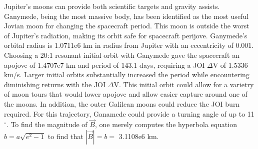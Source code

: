 \documentclass[]{aiaa-tc}%
\begin{document}
	\vspace{5 mm}

Jupiter's moons can provide both scientific targets and gravity assists. Ganymede, being the most massive body, has been identified as the most useful Jovian moon for changing the spacecraft period\cite{Damario}. This moon is outside the worst of Jupiter's radiation, making its orbit safe for spacecraft perijove. Ganymede's orbital radius is 1.0711e6 km in radius from Jupiter with an eccentricity of 0.001\cite{Damario}. Choosing a 20:1 resonant initial orbit with Ganymede gave the spacecraft an apojove of 1.4707e7 km and period of 143.1 days, requiring a JOI $\Delta$V of 1.5336 km/s. Larger initial orbits substantially increased the period while encountering diminishing returns with the JOI $\Delta$V. This initial orbit could allow for a varietry of moon tours that would lower apojove and allow easier capture around one of the moons. In addition, the outer Galilean moons could reduce the JOI burn required. For this trajectory, Ganamede could provide a turning angle of up to 11$^\circ$. To find the magnitude of $\vec{B}$, one merely computes the hyperbola equation $b=a\sqrt{e^2-1}$ to find that $\left |{\vec{B}}  \right |= b = $ 3.1108e6 km.
	
	\vspace{5 mm}
\end{document}
